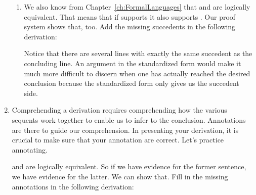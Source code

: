 \begin{enumerate}
\begin{enumerate}
\item We also know from Chapter~\ref{ch:FormalLanguages} that  and 
  are logically equivalent. That means that if \p{\Gamma} supports 
  it also supports . Our proof system shows that, too.  
 Add the missing succedents in the following derivation:
 \begin{argument*}







 \end{argument*}


 Notice that there are several lines with exactly the same succedent as the 
 concluding line. An argument in the standardized form would make it much more 
 difficult to discern when one has actually reached the desired conclusion 
 because the standardized form only gives us the succedent side.
\end{enumerate}

\item Comprehending a derivation requires comprehending how the various sequents 
 work together to enable us to infer to the conclusion. Annotations are there to 
 guide our comprehension. In presenting your derivation, it is crucial to make 
 sure that your annotation are correct. Let's practice annotating.

  and  are logically 
 equivalent. So if we have evidence for the former sentence, we have evidence 
 for the latter. We can show that.  Fill in the missing annotations in the 
 following derivation:

\begin{argument*}








\end{argument*}
\end{enumerate}
